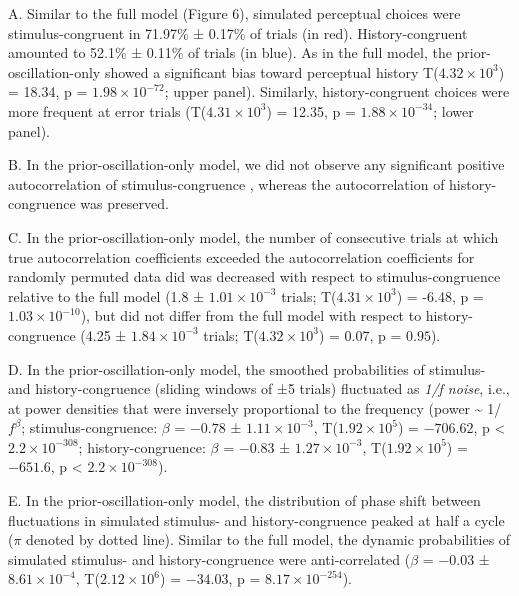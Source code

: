 \documentclass[
]{article}
\begin{document}
A. Similar to the full model (Figure 6), simulated perceptual choices
were stimulus-congruent in 71.97\% ± 0.17\% of trials (in red).
History-congruent amounted to 52.1\% ± 0.11\% of trials (in blue). As in
the full model, the prior-oscillation-only showed a significant bias
toward perceptual history T(\ensuremath{4.32\times 10^{3}}) = 18.34, p =
\(\ensuremath{1.98\times 10^{-72}}\); upper panel). Similarly,
history-congruent choices were more frequent at error trials
(T(\ensuremath{4.31\times 10^{3}}) = 12.35, p =
\(\ensuremath{1.88\times 10^{-34}}\); lower panel).

B. In the prior-oscillation-only model, we did not observe any
significant positive autocorrelation of stimulus-congruence , whereas
the autocorrelation of history-congruence was preserved.

C. In the prior-oscillation-only model, the number of consecutive trials
at which true autocorrelation coefficients exceeded the autocorrelation
coefficients for randomly permuted data did was decreased with respect
to stimulus-congruence relative to the full model (1.8 ±
\ensuremath{1.01\times 10^{-3}} trials;
T(\ensuremath{4.31\times 10^{3}}) = -6.48, p =
\(\ensuremath{1.03\times 10^{-10}}\)), but did not differ from the full
model with respect to history-congruence (4.25 ±
\ensuremath{1.84\times 10^{-3}} trials;
T(\ensuremath{4.32\times 10^{3}}) = 0.07, p = \(0.95\)).

D. In the prior-oscillation-only model, the smoothed probabilities of
stimulus- and history-congruence (sliding windows of ±5 trials)
fluctuated as \emph{1/f noise}, i.e., at power densities that were
inversely proportional to the frequency (power \textasciitilde{}
1/\(f^\beta\); stimulus-congruence: \(\beta\) = \(-0.78\) ±
\(\ensuremath{1.11\times 10^{-3}}\),
T(\(\ensuremath{1.92\times 10^{5}}\)) = \(-706.62\), p < \(\ensuremath{2.2\times 10^{-308}}\);
history-congruence: \(\beta\) = \(-0.83\) ±
\(\ensuremath{1.27\times 10^{-3}}\),
T(\(\ensuremath{1.92\times 10^{5}}\)) = \(-651.6\), p < \(\ensuremath{2.2\times 10^{-308}}\)).

E. In the prior-oscillation-only model, the distribution of phase shift
between fluctuations in simulated stimulus- and history-congruence
peaked at half a cycle (\(\pi\) denoted by dotted line). Similar to the
full model, the dynamic probabilities of simulated stimulus- and
history-congruence were anti-correlated (\(\beta\) = \(-0.03\) ±
\(\ensuremath{8.61\times 10^{-4}}\),
T(\(\ensuremath{2.12\times 10^{6}}\)) = \(-34.03\), p =
\(\ensuremath{8.17\times 10^{-254}}\)).
\end{document}
